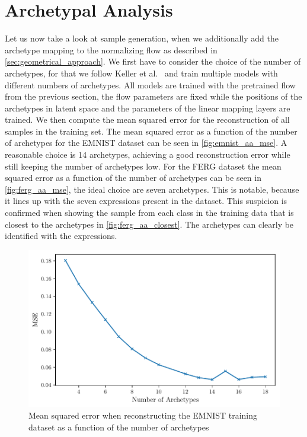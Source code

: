 \section{Archetypal Analysis}%
\label{sec:archetypal_analysis}

Let us now take a look at sample generation, when we additionally add the
archetype mapping to the normalizing flow as described in
\autoref{sec:geometrical_approach}. We first have to consider the choice of the
number of archetypes, for that we follow Keller et
al.~\citep{kellerLearningExtremalRepresentations2020} and train multiple models
with different numbers of archetypes. All models are trained with the
pretrained flow from the previous section, the flow parameters are fixed while
the positions of the archetypes in latent space and the parameters of the
linear mapping layers are trained. We then compute
the mean squared error for the reconstruction of all samples in the training
set. The mean squared error as a function of the number of archetypes for the
EMNIST dataset can be seen in \autoref{fig:emnist_aa_mse}. A reasonable choice
is 14 archetypes, achieving a good reconstruction error while still keeping the
number of archetypes low. For the FERG dataset the mean squared error as a
function of the number of archetypes can be seen in \autoref{fig:ferg_aa_mse},
the ideal choice are seven archetypes. This is notable, because it lines up
with the seven expressions present in the dataset. This suspicion is confirmed
when showing the sample from each class in the training data that is closest to
the archetypes in \autoref{fig:ferg_aa_closest}. The archetypes can clearly be
identified with the expressions.

\begin{figure}[htpb]
	\centering
	\includegraphics{figures/samples/aa_mse_EMNIST.pdf}
	\caption{Mean squared error when reconstructing the EMNIST training
		dataset as a function of the number of archetypes}%
	\label{fig:emnist_aa_mse}
\end{figure}

